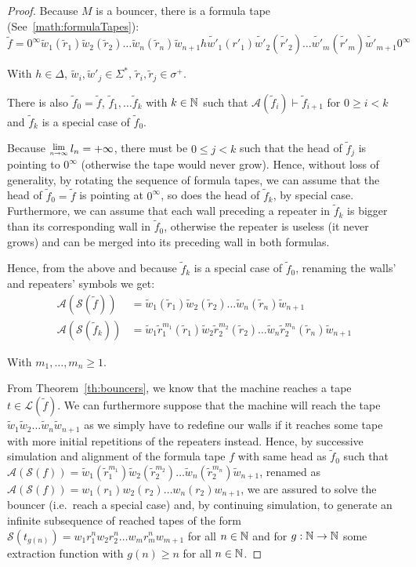 \begin{proof}
    Because $M$ is a bouncer, there is a formula tape (See~\eqref{math:formulaTapes}): $$\tilde{f} = 0^\infty\tilde{w}_1(\tilde{r}_1)\tilde{w}_2(\tilde{r}_2)\dots \tilde{w}_n(\tilde{r}_n) \tilde{w}_{n+1} h \tilde{w'}_1(r'_1)\tilde{w'}_2(\tilde{r'}_2)\dots \tilde{w'}_m(\tilde{r'}_m) \tilde{w'}_{m+1}0^\infty$$

    With $h\in\Delta$, $\tilde{w}_i, \tilde{w}'_j \in \Sigma^*$, $\tilde{r}_i, \tilde{r}_j \in \sigma^+$.

    There is also $\tilde{f}_0 = \tilde{f}$, $\tilde{f}_1, \dots \tilde{f}_k$ with $k \in \mathbb{N}$ such that $\mathcal{A}(\tilde{f}_i) \vdash \tilde{f}_{i+1}$ for $0 \geq i < k$ and $\tilde{f}_k$ is a special case of $\tilde{f}_0$.

    Because $\Lim{n\to\infty} l_n = +\infty$, there must be $0 \leq j < k$ such that the head of $\tilde{f}_{j}$ is pointing to $0^\infty$ (otherwise the tape would never grow). Hence, without loss of generality, by rotating the sequence of formula tapes, we can assume that the head of $\tilde{f}_{0}=\tilde{f}$ is pointing at $0^\infty$, so does the head of $\tilde{f}_k$, by special case. Furthermore, we can assume that each wall preceding a repeater in $\tilde{f}_k$ is bigger than its corresponding wall in $\tilde{f}_0$, otherwise the repeater is useless (it never grows) and can be merged into its preceding wall in both formulas.

    Hence, from the above and because $\tilde{f}_k$ is a special case of $\tilde{f}_0$, renaming the walls' and repeaters' symbols we get:
    \begin{align*}
        \mathcal{A}(\mathcal{S}(\tilde{f}))   & = \tilde{w}_1(\tilde{r}_1)\tilde{w}_2(\tilde{r}_2)\dots \tilde{w}_n(\tilde{r}_n) \tilde{w}_{n+1}                                                    \\
        \mathcal{A}(\mathcal{S}(\tilde{f}_k)) & = \tilde{w}_1\tilde{r}_1^{m_1}(\tilde{r}_1)\tilde{w}_2\tilde{r}_2^{m_2}(\tilde{r}_2)\dots \tilde{w}_n\tilde{r}_2^{m_n}(\tilde{r}_n) \tilde{w}_{n+1}
    \end{align*}

    With $m_1, \dots, m_n \geq 1$.

    From Theorem~\ref{th:bouncers}, we know that the machine reaches a tape $t\in\mathcal{L}(\tilde{f})$. We can furthermore suppose that the machine will reach the tape $\tilde{w}_1\tilde{w}_2\dots \tilde{w}_n \tilde{w}_{n+1}$ as we simply have to redefine our walls if it reaches some tape with more initial repetitions of the repeaters instead. Hence, by successive simulation and alignment of the formula tape $f$ with same head as $\tilde{f}_0$  such that $\mathcal{A}(\mathcal{S}(f)) = \tilde{w}_1(\tilde{r}_1^{m_1})\tilde{w}_2(\tilde{r}_2^{m_2})\dots \tilde{w}_n(\tilde{r}_2^{m_n}) \tilde{w}_{n+1}$, renamed as $\mathcal{A}(\mathcal{S}(f)) = w_1(r_1)w_2(r_2)\dots w_n(r_2) w_{n+1}$, we are assured to solve the bouncer (i.e.\ reach a special case) and, by continuing simulation, to generate an infinite subsequence of reached tapes of the form $\mathcal{S}(t_{g(n)})=w_1 r_1^n w_2 r_2^n \dots w_m r_m^n w_{m+1}$ for all $n\in\mathbb{N}$ and for $g: \mathbb{N} \to \mathbb{N}$ some extraction function with $g(n) \geq n$ for all $n \in \mathbb{N}$.


\end{proof}
